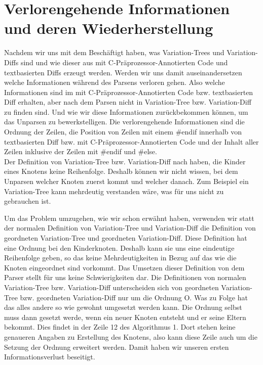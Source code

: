 \section{Verlorengehende Informationen und deren Wiederherstellung}

Nachdem wir uns mit dem Beschäftigt haben, was Variation-Trees und Variation-Diffs sind und wie dieser aus mit C-Präprozessor-Annotierten Code und textbasierten Diffs erzeugt werden. Werden wir uns damit auseinandersetzen welche Informationen während des Parsens verloren gehen. Also welche Informationen sind im mit C-Präprozessor-Annotierten Code bzw. textbasierten Diff erhalten, aber nach dem Parsen nicht in Variation-Tree bzw. Variation-Diff zu finden sind. Und wie wir diese Informationen zurückbekommen können, um das Unparsen zu bewerkstelligen. Die verlorengehende Informationen sind die Ordnung der Zeilen, die Position von  Zeilen mit einem \#endif innerhalb von textbasierten Diff bzw. mit C-Präprozessor-Annotierten Code und der Inhalt aller Zeilen inklusive der Zeilen mit \#endif und \#else.\\

Der Definition von Variation-Tree bzw. Variation-Diff nach haben, die Kinder eines Knotens keine Reihenfolge. Deshalb können wir nicht wissen, bei dem Unparsen welcher Knoten zuerst kommt und welcher danach. Zum Beispiel ein Variation-Tree kann mehrdeutig verstanden wäre, was für uns nicht zu gebrauchen ist.
\begin{figure}[H]
\end{figure}
Um das Problem umzugehen, wie wir schon erwähnt haben, verwenden wir statt der normalen Definition von Variation-Tree und Variation-Diff die Definition von geordneten Variation-Tree und geordneten Variation-Diff. Diese Definition hat eine Ordnung bei den Kinderknoten. Deshalb kann sie uns eine eindeutige Reihenfolge geben, so das keine Mehrdeutigkeiten in Bezug auf das wie die Knoten eingeordnet sind vorkommt. Das Umsetzen dieser Definition von dem Parser stellt für uns keine Schwierigkeiten dar. Die Definitionen von normalen Variation-Tree bzw. Variation-Diff unterscheiden sich von geordneten Variation-Tree bzw. geordneten Variation-Diff nur um die Ordnung O. Was zu Folge hat das alles andere so wie gewohnt umgesetzt werden kann. Die Ordnung selbst muss dann gesetzt werde, wenn ein neuer Knoten entsteht und er seine Eltern bekommt. Dies findet in der Zeile 12 des Algorithmus 1. Dort stehen keine genaueren Angaben zu Erstellung des Knotens, also kann diese Zeile auch um die Setzung der Ordnung erweitert werden. Damit haben wir unseren ersten Informationsverlust beseitigt.\\

